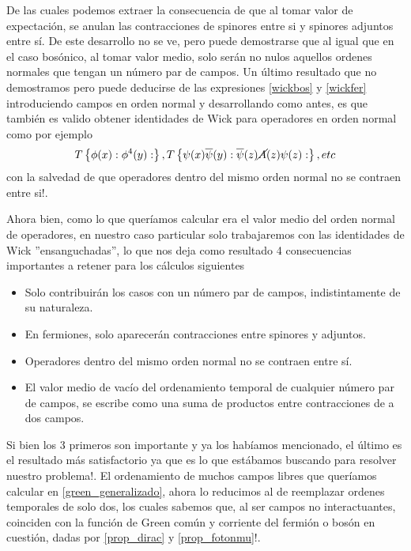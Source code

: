 \documentclass[tickz]{article}
\numberwithin{equation}{section}
\begin{document}
De las cuales podemos extraer la consecuencia de que al tomar valor
de expectación, se anulan las contracciones de spinores entre si y
spinores adjuntos entre sí. De este desarrollo no se ve, pero puede
demostrarse que al igual que en el caso bosónico, al tomar valor medio,
solo serán no nulos aquellos ordenes normales que tengan un número
par de campos. Un último resultado que no demostramos pero puede deducirse
de las expresiones \ref{wickbos} y \ref{wickfer} introduciendo campos en orden normal y
desarrollando como antes, es que también es valido obtener identidades
de Wick para operadores en orden normal como por ejemplo
\begin{equation}
T\left\{ \phi(x):\phi^{4}(y):\right\} ,T\left\{ \psi(x)\overline{\psi}(y):\overline{\psi}(z)\cancel{A}(z)\psi(z):\right\} ,etc
\end{equation}
con la salvedad de que operadores dentro del mismo orden normal no
se contraen entre si!.

Ahora bien, como lo que queríamos calcular era el valor medio del
orden normal de operadores, en nuestro caso particular solo trabajaremos con las identidades
de Wick ''ensanguchadas'', lo que nos deja como resultado 4 consecuencias
importantes a retener para los cálculos siguientes

\begin{itemize}
	\item Solo contribuirán los casos con un número par de campos, indistintamente
	de su naturaleza.
	\item En fermiones, solo aparecerán contracciones entre spinores y adjuntos.
	\item Operadores dentro del mismo orden normal no se contraen entre sí.
	\item El valor medio de vacío del ordenamiento temporal de cualquier número
	par de campos, se escribe como una suma de productos entre contracciones
	de a dos campos.
\end{itemize}

Si bien los 3 primeros son importante y ya los habíamos mencionado,
el último es el resultado más satisfactorio ya que es lo que estábamos
buscando para resolver nuestro problema!. El ordenamiento de muchos
campos libres que queríamos calcular en \ref{green_generalizado}, ahora lo reducimos al de reemplazar ordenes temporales de solo
dos, los cuales sabemos que, al ser campos no interactuantes, coinciden con la función de Green común
y corriente del fermión o bosón en cuestión, dadas por \ref{prop_dirac} y \ref{prop_fotonmu}!. 
\end{document}
